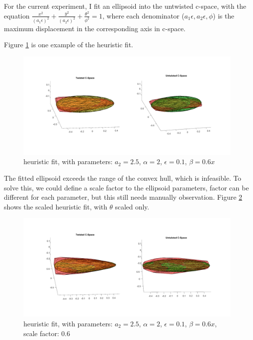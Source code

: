 \documentclass{article}
\begin{document}
\begin{enumerate}
For the current experiment, I fit an ellipsoid into the untwisted c-space, with the equation $\frac{x^2}{(a_1 \epsilon)^2} + \frac{y^2}{(a_2 \epsilon)^2} + \frac{\theta^2}{\phi^2} = 1$, where each denominator ($a_1 \epsilon, a_2 \epsilon, \phi$) is the maximum displacement in the corresponding axis in c-space.

Figure \ref{twist_fit} is one example of the heuristic fit.
\begin{figure}
\includegraphics[scale = 0.25]{fig/twist-untwist_c-space_fit.png}
\caption{heuristic fit, with parameters: $a_2 = 2.5$, $\alpha = 2$, $\epsilon = 0.1$, $\beta = 0.6x$}
\label{twist_fit}
\end{figure}
The fitted ellipsoid exceeds the range of the convex hull, which is infeasible. To solve this, we could define a scale factor to the ellipsoid parameters, factor can be different for each parameter, but this still needs manually observation. Figure \ref{fit_scaled} shows the scaled heuristic fit, with $\theta$ scaled only.

\begin{figure}
\includegraphics[scale = 0.25]{fig/twist-untwist_c-space_fit_scaled.png}
\caption{heuristic fit, with parameters: $a_2 = 2.5$, $\alpha = 2$, $\epsilon = 0.1$, $\beta = 0.6x$, scale factor: 0.6}
\label{fit_scaled}
\end{figure}


\end{enumerate}
\end{document}
